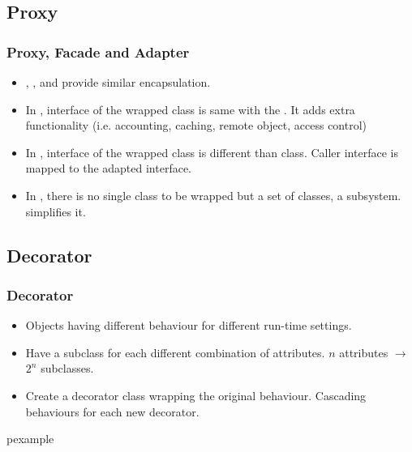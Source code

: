\documentclass[trans,compress,xcolor=table]{beamer}
\begin{document}
\subsection{Proxy}
\frametitle{Proxy, Facade and Adapter}
\begin{frame}
\begin{itemize}
\item {}, , and  provide similar
	encapsulation.
\item In , interface of the wrapped class is same with the . It adds extra functionality (i.e. accounting, caching, remote object, access control)
\item In , interface of the wrapped class is different than  class. 
Caller interface is mapped to the adapted interface.
\item In , there is no single class to be wrapped but a set of classes, a subsystem.  simplifies it.
\end{itemize}
\end{frame}

\subsection{Decorator}
\begin{frame}
\frametitle{Decorator}
\begin{itemize}
\item {} Objects having different behaviour for different 
run-time settings. 
\item {} Have a subclass for each different
combination of attributes. $n$ attributes $\rightarrow$ $2^n$ subclasses.
\item {} Create a decorator class wrapping the original
behaviour. Cascading behaviours for each new decorator.
\end{itemize}
\end{frame}

\begin{frame}
\begin{beamercolorbox}{pexample}
\codedecor
\end{beamercolorbox}
\end{frame}
\end{document}

